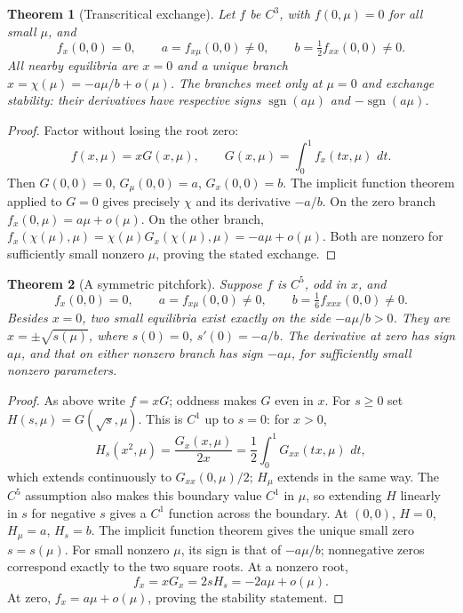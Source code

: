 \documentclass[11pt,oneside]{book}
\newtheorem{theorem}{Theorem}[chapter]
\theoremstyle{definition}
\theoremstyle{remark}\newtheorem{remark}[theorem]{Remark}
\newcommand{\dd}{\,d}\newcommand{\id}{\operatorname{id}}
\begin{document}
\begin{theorem}[Transcritical exchange]\label{d13:16:transcritical}
Let \(f\) be \(C^3\), with \(f(0,\mu)=0\) for all small \(\mu\), and
\[
 f_x(0,0)=0,\qquad a=f_{x\mu}(0,0)\neq0,\qquad
 b=\tfrac12f_{xx}(0,0)\neq0 .
\]
All nearby equilibria are \(x=0\) and a unique branch
\(x=\chi(\mu)=-a\mu/b+o(\mu)\). The branches meet only at \(\mu=0\)
and exchange stability: their derivatives have respective signs
\(\operatorname{sgn}(a\mu)\) and \(-\operatorname{sgn}(a\mu)\).
\end{theorem}
\begin{proof}
Factor without losing the root zero:
\[
 f(x,\mu)=xG(x,\mu),\qquad
 G(x,\mu)=\int_0^1f_x(tx,\mu)\,\dd t.
\]
Then \(G(0,0)=0\), \(G_\mu(0,0)=a\), \(G_x(0,0)=b\).
The implicit function theorem applied to \(G=0\) gives precisely
\(\chi\) and its derivative \(-a/b\). On the zero branch
\(f_x(0,\mu)=a\mu+o(\mu)\). On the other branch,
\(f_x(\chi(\mu),\mu)=\chi(\mu)G_x(\chi(\mu),\mu)
=-a\mu+o(\mu)\). Both are nonzero for sufficiently small nonzero
\(\mu\), proving the stated exchange.
\end{proof}

\begin{theorem}[A symmetric pitchfork]\label{d13:16:pitchfork}
Suppose \(f\) is \(C^5\), odd in \(x\), and
\[
 f_x(0,0)=0,\qquad a=f_{x\mu}(0,0)\neq0,\qquad
 b=\tfrac16f_{xxx}(0,0)\neq0 .
\]
Besides \(x=0\), two small equilibria exist exactly on the side
\(-a\mu/b>0\). They are \(x=\pm\sqrt{s(\mu)}\), where
\(s(0)=0\), \(s'(0)=-a/b\).
The derivative at zero has sign \(a\mu\), and that on either nonzero
branch has sign \(-a\mu\), for sufficiently small nonzero parameters.
\end{theorem}
\begin{proof}
As above write \(f=xG\); oddness makes \(G\) even in \(x\).
For \(s\geq0\) set \(H(s,\mu)=G(\sqrt{s},\mu)\).
This is \(C^1\) up to \(s=0\): for \(x>0\),
\[
 H_s(x^2,\mu)=\frac{G_x(x,\mu)}{2x}
 =\frac12\int_0^1G_{xx}(tx,\mu)\,\dd t ,
\]
which extends continuously to \(G_{xx}(0,\mu)/2\);
\(H_\mu\) extends in the same way. The \(C^5\) assumption also makes
this boundary value \(C^1\) in \(\mu\), so extending \(H\) linearly
in \(s\) for negative \(s\) gives a \(C^1\) function across the boundary.
At \((0,0)\), \(H=0\), \(H_\mu=a\), \(H_s=b\). The implicit function
theorem gives the unique small zero \(s=s(\mu)\). For small nonzero
\(\mu\), its sign is that of \(-a\mu/b\); nonnegative zeros correspond
exactly to the two square roots. At a nonzero root,
\[
 f_x=xG_x=2sH_s=-2a\mu+o(\mu).
\]
At zero, \(f_x=a\mu+o(\mu)\), proving the stability statement.
\end{proof}
\end{document}
